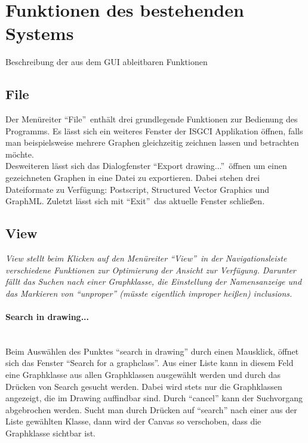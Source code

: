 \documentclass[10pt,a4paper]{article}
\begin{document}
\section{Funktionen des bestehenden Systems}
Beschreibung der aus dem GUI ableitbaren Funktionen
\subsection{File}
Der Menüreiter "`File"'\ enthält drei grundlegende Funktionen zur Bedienung des Programms. Es lässt sich ein weiteres Fenster der ISGCI Applikation öffnen, falls man beispielsweise mehrere Graphen gleichzeitig zeichnen lassen und betrachten möchte.\\
Desweiteren lässt sich das Dialogfenster "`Export drawing..."'\ öffnen um einen gezeichneten Graphen in eine Datei zu exportieren. Dabei stehen drei Dateiformate zu Verfügung: Postscript, Structured Vector Graphics und GraphML. Zuletzt lässt sich mit "`Exit"'\ das aktuelle Fenster schließen.\\

\subsection{View}
\emph{View stellt beim Klicken auf den Menüreiter "`View"'\ in der Navigationsleiste verschiedene Funktionen zur Optimierung der Ansicht zur Verfügung. Darunter fällt das Suchen nach einer Graphklasse, die Einstellung der Namensanzeige und das Markieren von "`unproper"' (müsste eigentlich improper heißen) inclusions.}\\

\paragraph{Search in drawing...}\ \\
Beim Auswählen des Punktes "`search in drawing"' durch einen Mausklick, öffnet sich das Fenster "`Search for a graphclass"'. Aus einer Liste kann in diesem Feld eine Graphklasse aus allen Graphklassen ausgewählt werden und durch das Drücken von Search gesucht werden. Dabei wird stets nur die Graphklassen angezeigt, die im Drawing auffindbar sind. Durch "`cancel"' kann der Suchvorgang abgebrochen werden. Sucht man durch Drücken auf "`search"' nach einer aus der Liste gewählten Klasse, dann wird der Canvas so verschoben, dass die Graphklasse sichtbar ist.
\end{document}
